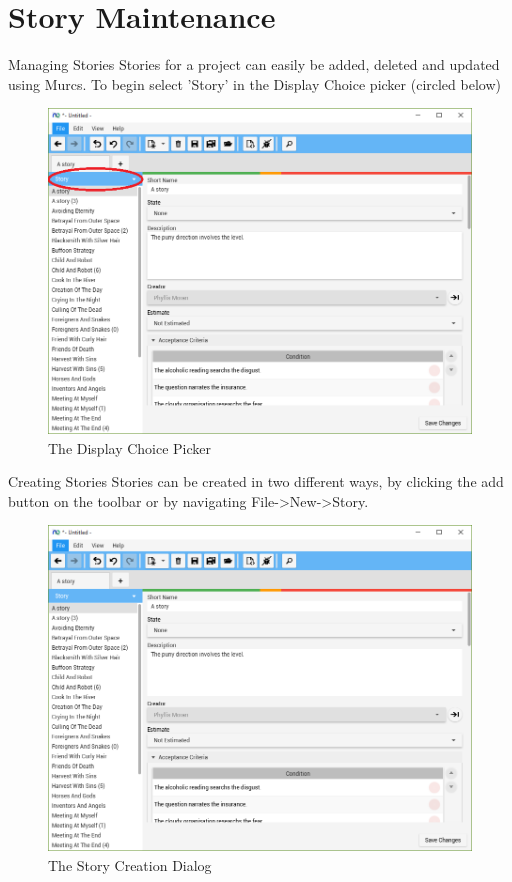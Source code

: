 \section{Story Maintenance}

Managing Stories
\newline
Stories for a project can easily be added, deleted and updated using Murcs. To begin select 'Story' in the Display Choice picker (circled below)

\begin{figure}[H]
\centering
\includegraphics[width=\textwidth]{images/screenshots/stories1.PNG}
\caption{The Display Choice Picker}
\label{fig:new_project}
\end{figure}

Creating Stories
Stories can be created in two different ways, by clicking the add button on the toolbar or by navigating File->New->Story.

\begin{figure}[H]
\centering
\includegraphics[width=\textwidth]{images/screenshots/stories2.PNG}
\caption{The Story Creation Dialog}
\label{fig:new_project}
\end{figure}

